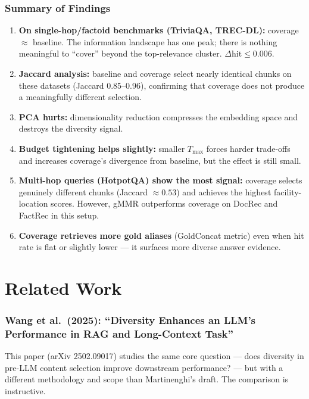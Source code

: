 \documentclass[11pt,a4paper]{article}
\begin{document}
\section{Summary of Findings}

\begin{enumerate}[leftmargin=*]
	\item \textbf{On single-hop/factoid benchmarks (TriviaQA, TREC-DL):} coverage $\approx$ baseline. The information landscape has one peak; there is nothing meaningful to ``cover'' beyond the top-relevance cluster. $\Delta\text{hit} \leq 0.006$.
	\item \textbf{Jaccard analysis:} baseline and coverage select nearly identical chunks on these datasets (Jaccard 0.85--0.96), confirming that coverage does not produce a meaningfully different selection.
	\item \textbf{PCA hurts:} dimensionality reduction compresses the embedding space and destroys the diversity signal.
	\item \textbf{Budget tightening helps slightly:} smaller $T_{\max}$ forces harder trade-offs and increases coverage's divergence from baseline, but the effect is still small.
	\item \textbf{Multi-hop queries (HotpotQA) show the most signal:} coverage selects genuinely different chunks (Jaccard $\approx 0.53$) and achieves the highest facility-location scores. However, gMMR outperforms coverage on DocRec and FactRec in this setup.
	\item \textbf{Coverage retrieves more gold aliases} (GoldConcat metric) even when hit rate is flat or slightly lower --- it surfaces more diverse answer evidence.
\end{enumerate}

\newpage
\part{Related Work}

\section{Wang et al.\ (2025): ``Diversity Enhances an LLM's Performance in RAG and Long-Context Task''}

This paper (arXiv 2502.09017) studies the same core question --- does diversity in pre-LLM content selection improve downstream performance? --- but with a different methodology and scope than Martinenghi's draft. The comparison is instructive.
\end{document}
